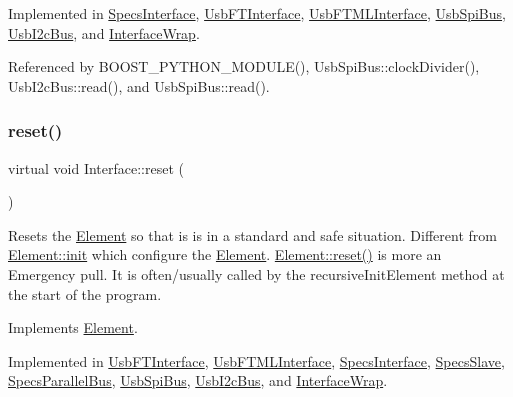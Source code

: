 Implemented in \hyperlink{classSpecsInterface_a6f1c8ca420f08c8fca9347ca743087c5}{Specs\+Interface}, \hyperlink{classUsbFTInterface_ab9daafce1d7878b95ba0655a570922e2}{Usb\+F\+T\+Interface}, \hyperlink{classUsbFTMLInterface_a9999929c6169c8b4ebe57b687b2dac28}{Usb\+F\+T\+M\+L\+Interface}, \hyperlink{classUsbSpiBus_a6c08e2e9a50e4c540c1eda6d7d2967a5}{Usb\+Spi\+Bus}, \hyperlink{classUsbI2cBus_a142e9ab303f5e36f5ac4b4dd46d9b375}{Usb\+I2c\+Bus}, and \hyperlink{structInterfaceWrap_a4dd40213e6d37c73521450aa0c7a8f4d}{Interface\+Wrap}.



Referenced by B\+O\+O\+S\+T\+\_\+\+P\+Y\+T\+H\+O\+N\+\_\+\+M\+O\+D\+U\+L\+E(), Usb\+Spi\+Bus\+::clock\+Divider(), Usb\+I2c\+Bus\+::read(), and Usb\+Spi\+Bus\+::read().

\mbox{\label{classInterface_a4d44329cea9981a9e0392eaaf99efadd}} 
\subsubsection{\texorpdfstring{reset()}{reset()}}
{\footnotesize\ttfamily virtual void Interface\+::reset (\begin{DoxyParamCaption}{ }\end{DoxyParamCaption})\hspace{0.3cm}{\ttfamily [pure virtual]}}

Resets the \hyperlink{classElement}{Element} so that is is in a standard and safe situation. Different from \hyperlink{classElement_af42754b5cabc198869222725218d695c}{Element\+::init} which configure the \hyperlink{classElement}{Element}. \hyperlink{classElement_a69efffa22f06909d768149715565cb56}{Element\+::reset()} is more an Emergency pull. It is often/usually called by the recursive\+Init\+Element method at the start of the program. 

Implements \hyperlink{classElement_a69efffa22f06909d768149715565cb56}{Element}.



Implemented in \hyperlink{classUsbFTInterface_a7bd95c22da69daeaad7f752f560740f4}{Usb\+F\+T\+Interface}, \hyperlink{classUsbFTMLInterface_a1e53e5a0453e9aa731d1ec07aacbc8ab}{Usb\+F\+T\+M\+L\+Interface}, \hyperlink{classSpecsInterface_ade474eeef32f10c72926c9ba7d23f9a8}{Specs\+Interface}, \hyperlink{classSpecsSlave_a6c69baff5941cabed2947f547041bbeb}{Specs\+Slave}, \hyperlink{classSpecsParallelBus_af8e41f6efecc8d65cf7d7a884a33d4ee}{Specs\+Parallel\+Bus}, \hyperlink{classUsbSpiBus_aa795a27f7429f0c0285056964659d433}{Usb\+Spi\+Bus}, \hyperlink{classUsbI2cBus_a4063433fd349fff112f4e2ceb3d35072}{Usb\+I2c\+Bus}, and \hyperlink{structInterfaceWrap_a6c350b2f44c579187e6e4269cae29bae}{Interface\+Wrap}.



